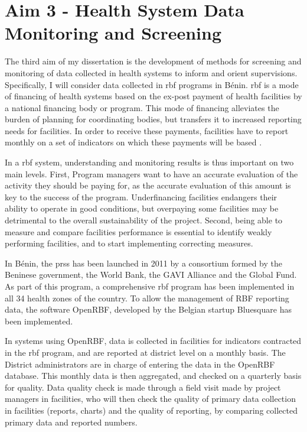 \section[Data Monitoring]{Aim 3 - Health System Data Monitoring and Screening}

The third aim of my dissertation is the development of methods for screening and monitoring of data collected in health systems to inform and orient supervisions. Specifically, I will consider data collected in \gls{rbf} programs in Bénin. \gls{rbf} is a mode of financing of health systems based on the ex-post payment of health facilities by a national financing body or program. This mode of financing alleviates the burden of planning for coordinating bodies, but transfers it to increased reporting needs for facilities. In order to receive these payments, facilities have to report monthly on a set of indicators on which these payments will be based \citep{musgrove_financial_2011}.

In a \gls{rbf} system, understanding and monitoring results is thus important on two main levels. First, Program managers want to have an accurate evaluation of the activity they should be paying for, as the accurate evaluation of this amount is key to the success of the program. Underfinancing facilities endangers their ability to operate in good conditions, but overpaying some facilities may be detrimental to the overall sustainability of the project. Second, being able to measure and compare facilities performance is essential to identify weakly performing facilities, and to start implementing correcting measures.

In Bénin, the \gls{prss} has been launched in 2011 by a consortium formed by the Beninese government, the World Bank, the GAVI Alliance and the Global Fund. As part of this program, a comprehensive \gls{rbf} program has been implemented in all 34 health zones of the country. To allow the management of RBF reporting data, the software OpenRBF, developed by the Belgian startup Bluesquare has been implemented.

In systems using OpenRBF, data is collected in facilities for indicators contracted in the \gls{rbf} program, and are reported at district level on a monthly basis. The District administrators are in charge of entering the data in the OpenRBF database. This monthly data is then aggregated, and checked on a quarterly basis for quality. Data quality check is made through a field visit made by project managers in facilities, who will then check the quality of primary data collection in facilities (reports, charts) and the quality of reporting, by comparing collected primary data and reported numbers.

